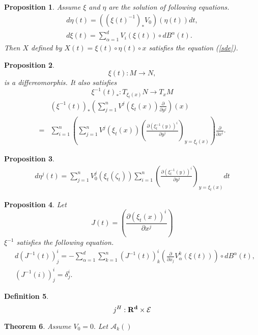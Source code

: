 \documentclass[12pt]{article}
\newtheorem{thm}{Theorem}%
\newtheorem{prop}[thm]{Proposition}%
\newtheorem{defi}[thm]{Definition}
\def\A{{\mathcal{A}}}
\begin{document}
\begin{prop}
    Assume $\xi$ and $\eta$ are the solution of following equations.
    \begin{align}
       d \eta(t)  =  \left(\left(\xi(t)^{-1} \right)_* V_0\right)(\eta(t)) dt, \\
       d \xi(t) = \sum_{\alpha=1}^d V_i \left(\xi(t) \right)\circ dB^{\alpha}(t).
    \end{align}
    Then $X$ defined by $X(t) = \xi(t) \circ \eta(t) \circ x$ satisfies the equation (\ref{sde}).
\end{prop}

\begin{prop}
    $$\xi(t) : M \rightarrow N, $$ is a differeomorphis. It also satisfies
    $$\xi^{-1}(t)_* : T_{\xi_t(x)}N \rightarrow T_{x}M$$
    \begin{align}
        &\left( \xi^{-1}(t) \right)_* \left(\sum_{j=1}^n V^j\left(\xi_t(x)\right) \frac{\partial}{\partial y^j} \right) (x)\\
        =  &\sum_{i=1}^n \left(\sum_{j=1}^n V^j\left(\xi_t(x) \right) \left( \frac{\partial \left(\xi^{-1}_t(y)\right)^i}{\partial y^j} \right)_{y=\xi_t(x)} \right)\frac{\partial}{\partial x^i}.
    \end{align}
\end{prop}

\begin{prop}
    \begin{align}
       d \eta^j(t) =  \sum_{j=1}^n V_0^j \left( \xi_t \left( \zeta_t \right) \right)  \sum_{i=1}^n \left( \frac{\partial \left(\xi^{-1}_t(y)\right)^i}{\partial y^j} \right)_{y=\xi_t(x)} dt
    \end{align}
\end{prop}

\begin{prop}
    Let 
    $$J(t) = \left( \frac{\partial \left(\xi_t(x)\right)^i}{\partial x^j} \right)$$
    $\xi^{-1}$ satisfies the following equation.
   \begin{align}
      &d (J^{-1}(t))^i_j  = -\sum_{\alpha=1}^d \sum_{k=1}^n (J^{-1}(t))^i_k \left(\frac{\partial }{\partial {x_j}} V^k_{\alpha}(\xi(t)) \right) \circ dB^{\alpha}(t),\\
      &(J^{-1}(i))^i_j = \delta^i_j.
   \end{align}
\end{prop}

\begin{defi}
$$j^H : \bf{R}^d \times \mathcal{E}$$
\end{defi}

\begin{thm}
    Assume $V_0 = 0.$
    Let $\A_k()$
\end{thm}
\end{document}
